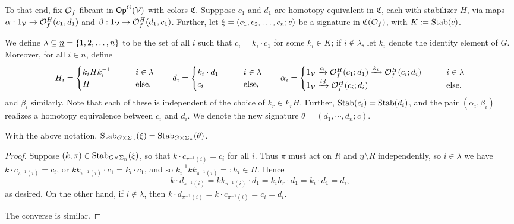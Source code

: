 \documentclass[psamsfonts,oneside,10pt,letterpaper
,draft
]{amsart}%
\renewcommand{\C}{\ensuremath{\mathfrak{C}}}
\renewcommand{\1}{\ensuremath{\mathbb{id}}}
\begin{document}
To that end, fix $\mathcal{O}_f$ fibrant in $\mathsf{Op}^G(\mathcal V)$ with colors $\C$.
Supppose $c_1$ and $d_1$ are homotopy equivalent in $\C$, each with stabilizer $H$,
via maps $\alpha: 1_{\mathcal V} \to \mathcal{O}_f^H(c_1,d_1)$ and $\beta: 1_{\mathcal V} \to \mathcal{O}_f^H(d_1,c_1)$.
Further, let $\xi = (c_1,c_2,\dots, c_n;c)$ be a signature in $\C(\O_f)$, with $K := \mathrm{Stab}(c)$.

We define $\lambda \subseteq \underline{n} = \left\{1,2,\ldots, n\right\}$ to be
the set of all $i$ such that $c_i = k_i \cdot c_1$ for some $k_i\in K$;
if $i \notin \lambda$, let $k_i$ denote the identity element of $G$.
Moreover, for all $i \in \underline{n}$, define
\begin{equation}
      H_i =
      \begin{cases}
            k_i H k_i^{-1} \qquad & i \in \lambda
            \\
            H & \mbox{else,}
      \end{cases}
      \qquad
      d_i =
      \begin{cases}
            k_i \cdot d_1 \qquad & i \in \lambda
            \\
            c_i & \mbox{else},
      \end{cases}
      \qquad 
      \alpha_i =
      \begin{cases}
            1_{\mathcal V} \xrightarrow{\alpha} \mathcal{O}^H_f(c_1;d_1) \xrightarrow{k_i} \mathcal{O}^H_f(c_i;d_i) \qquad & i \in \lambda
            \\
            1_{\mathcal V} \xrightarrow{id} \mathcal{O}^H_f(c_i;d_i) & \mbox{else},
      \end{cases}
\end{equation}
and $\beta_i$ similarly.
Note that each of these is independent of the choice of $k_r\in k_r H$.
Further, $\mathrm{Stab}(c_i) = \mathrm{Stab}(d_i)$, and
the pair $(\alpha_i,\beta_i)$ realizes a homotopy equivalence between $c_i$ and $d_i$.
We denote the new signature $\theta = (d_1,\cdots,d_n;c)$.

\begin{lemma}
      With the above notation, $\mathrm{Stab}_{G \times \Sigma_n}(\xi) = \mathrm{Stab}_{G \times \Sigma_n}(\theta)$. 
\end{lemma}
\begin{proof}
      Suppose $(k,\pi)\in \mathrm{Stab}_{G\times \Sigma_n}(\xi)$, so that $k \cdot c_{\pi^{-1}(i)} = c_i$ for all $i$.
      Thus $\pi$ must act on $R$ and $\underline{n} \setminus R$ independently,
      so $i \in \lambda$ we have $k \cdot c_{\pi^{-1}(i)} = c_i$, or
      $k k_{\pi^{-1}(i)} \cdot c_1 = k_i \cdot c_1$, and so
      $k_i^{-1} k k_{\pi^{-1}(i)} =:h_i \in H$. Hence 
      \begin{equation}
            k \cdot d_{\pi^{-1}(i)} = k k_{\pi^{-1}(i)} \cdot d_1 = k_i h_r \cdot d_1 = k_i \cdot d_1 = d_i,
      \end{equation}
      as desired.
      On the other hand, if $i \not \in \lambda$, then
      $k \cdot d_{\pi^{-1}(i)} = k \cdot c_{\pi^{-1}(i)} = c_i = d_i$.

      The converse is similar.
\end{proof}
\end{document}
